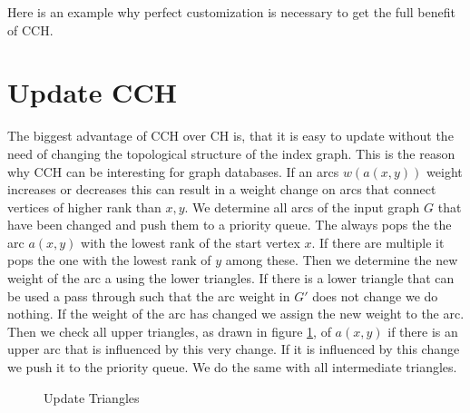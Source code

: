Here is an example why perfect customization is necessary to get the full
benefit of CCH.

\section{Update CCH}




The biggest advantage of CCH over CH is, that it is easy to update without the need of changing the topological structure of the index graph. This is the reason why CCH can be interesting for graph databases.
If an arcs $w(a(x, y))$ weight increases or decreases this can result in a weight change on arcs that connect vertices of higher rank than $x, y$. We determine all arcs of the input graph $G$ that have been changed 
and push them to a priority queue. The always pops the the arc $a(x,y)$ with the lowest rank of the start vertex $x$. If there are multiple it pops the one with the lowest rank of $y$ among these. Then we determine 
the new weight of the arc a using the lower triangles. If there is a lower triangle that can be used a pass through such that the arc weight in $G'$ does not change we do nothing. If the weight of the arc has changed
we assign the new weight to the arc. Then we check all upper triangles, as drawn in figure \ref{fig:updateTriangles}, of $a(x,y)$ if there is an upper arc that is influenced by this very change. If it is influenced by this
change we push it to the priority queue. We do the same with all intermediate triangles. 
\\


\begin{figure}
    \centering
    
    \caption{Update Triangles}
    \label{fig:updateTriangles}
\end{figure}



